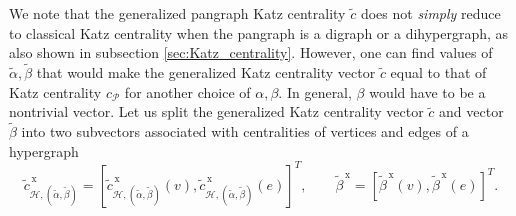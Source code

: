 \documentclass[a4paper,12pt]{article}
\theoremstyle{definition}
\theoremstyle{remark}
\newcommand{\mH}{\mathcal{H}}
\newcommand{\mP}{\mathcal{P}}
\begin{document}
We note that the generalized pangraph Katz centrality $\tilde{c}$ does not \emph{simply} reduce to classical Katz centrality when the pangraph is a digraph or a dihypergraph, as also shown in subsection \ref{sec:Katz_centrality}. However, one can find values of $\tilde{\alpha}, \tilde{\beta}$ that would make the generalized Katz centrality vector $\tilde{c}$ equal to that of Katz centrality $c_{\mP}$ for another choice of $\alpha, \beta$. In general, $\beta$ would have to be a nontrivial vector. Let us split the generalized Katz centrality vector $\tilde{c}$ and vector $\tilde{\beta}$ into two subvectors associated with centralities of vertices and edges of a hypergraph 
\begin{equation}\label{eq:c_split}
\tilde{c}^{\,\textrm{x}}_{\mH, (\tilde{\alpha},\tilde{\beta})}=[\tilde{c}^{\,\textrm{x}}_{\mH, (\tilde{\alpha},\tilde{\beta})}(v), \tilde{c}^{\,\textrm{x}}_{\mH, (\tilde{\alpha},\tilde{\beta})}(e)]^T,\qquad \tilde{\beta}^{\,\textrm{x}}=[\tilde{\beta}^{\,\textrm{x}}(v),\tilde{\beta}^{\,\textrm{x}}(e)]^T.
\end{equation}
\end{document}
